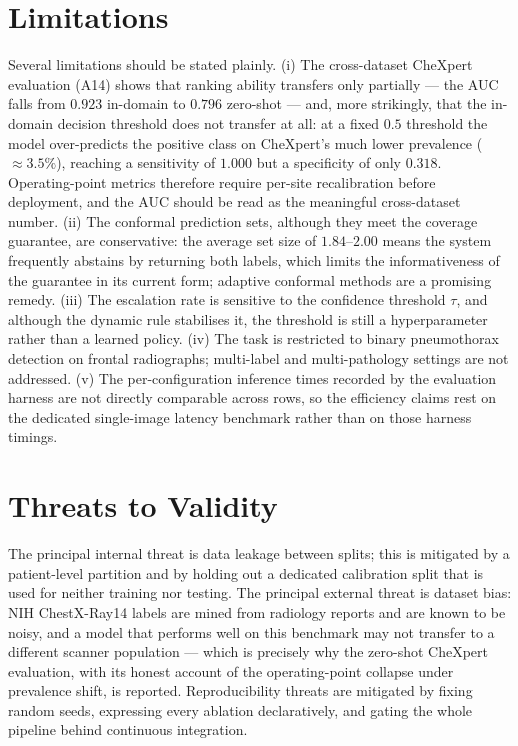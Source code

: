 \section{Limitations}
Several limitations should be stated plainly. (i) The cross-dataset CheXpert evaluation (A14) shows that ranking ability transfers only partially --- the AUC falls from $0.923$ in-domain to $0.796$ zero-shot --- and, more strikingly, that the in-domain decision threshold does not transfer at all: at a fixed $0.5$ threshold the model over-predicts the positive class on CheXpert's much lower prevalence ($\approx 3.5\%$), reaching a sensitivity of $1.000$ but a specificity of only $0.318$. Operating-point metrics therefore require per-site recalibration before deployment, and the AUC should be read as the meaningful cross-dataset number. (ii) The conformal prediction sets, although they meet the coverage guarantee, are conservative: the average set size of $1.84$--$2.00$ means the system frequently abstains by returning both labels, which limits the informativeness of the guarantee in its current form; adaptive conformal methods \cite{romano2020classification, angelopoulos2021uncertainty} are a promising remedy. (iii) The escalation rate is sensitive to the confidence threshold $\tau$, and although the dynamic rule stabilises it, the threshold is still a hyperparameter rather than a learned policy. (iv) The task is restricted to binary pneumothorax detection on frontal radiographs; multi-label and multi-pathology settings are not addressed. (v) The per-configuration inference times recorded by the evaluation harness are not directly comparable across rows, so the efficiency claims rest on the dedicated single-image latency benchmark rather than on those harness timings.

\section{Threats to Validity}
The principal internal threat is data leakage between splits; this is mitigated by a patient-level partition and by holding out a dedicated calibration split that is used for neither training nor testing. The principal external threat is dataset bias: NIH ChestX-Ray14 labels are mined from radiology reports and are known to be noisy, and a model that performs well on this benchmark may not transfer to a different scanner population --- which is precisely why the zero-shot CheXpert evaluation, with its honest account of the operating-point collapse under prevalence shift, is reported. Reproducibility threats are mitigated by fixing random seeds, expressing every ablation declaratively, and gating the whole pipeline behind continuous integration.

